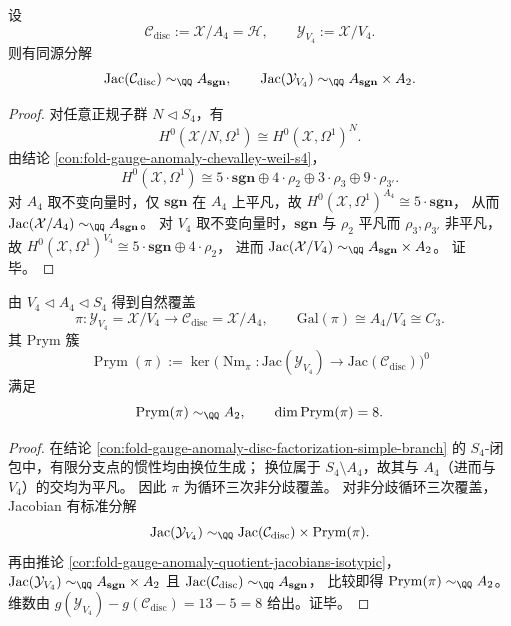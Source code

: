 \begin{corollary}\label{cor:fold-gauge-anomaly-quotient-jacobians-isotypic}
设
\[
\mathcal C_{\mathrm{disc}}:=\mathcal X/A_4=\mathcal H,
\qquad
\mathcal Y_{V_4}:=\mathcal X/V_4.
\]
则有同源分解
\[
\mathrm{Jac}(\mathcal C_{\mathrm{disc}})\sim_{\QQ}A_{\mathbf{sgn}},
\qquad
\mathrm{Jac}(\mathcal Y_{V_4})\sim_{\QQ}A_{\mathbf{sgn}}\times A_2.
\]
\end{corollary}
\begin{proof}
对任意正规子群 \(N\triangleleft S_4\)，有
\[
H^0(\mathcal X/N,\Omega^1)\cong H^0(\mathcal X,\Omega^1)^N.
\]
由结论 \ref{con:fold-gauge-anomaly-chevalley-weil-s4}，
\[
H^0(\mathcal X,\Omega^1)\cong
5\cdot \mathbf{sgn}\oplus 4\cdot \rho_2\oplus 3\cdot \rho_3\oplus 9\cdot \rho_{3'}.
\]
对 \(A_4\) 取不变向量时，仅 \(\mathbf{sgn}\) 在 \(A_4\) 上平凡，故
\(
H^0(\mathcal X,\Omega^1)^{A_4}\cong 5\cdot\mathbf{sgn}
\)，
从而 \(\mathrm{Jac}(\mathcal X/A_4)\sim_{\QQ}A_{\mathbf{sgn}}\)。
对 \(V_4\) 取不变向量时，\(\mathbf{sgn}\) 与 \(\rho_2\) 平凡而 \(\rho_3,\rho_{3'}\) 非平凡，故
\(
H^0(\mathcal X,\Omega^1)^{V_4}\cong 5\cdot\mathbf{sgn}\oplus 4\cdot\rho_2
\)，
进而
\(
\mathrm{Jac}(\mathcal X/V_4)\sim_{\QQ}A_{\mathbf{sgn}}\times A_2
\)。
证毕。
\end{proof}

\begin{theorem}\label{thm:fold-gauge-anomaly-a2-prym-realization}
由 \(V_4\triangleleft A_4\triangleleft S_4\) 得到自然覆盖
\[
\pi:\mathcal Y_{V_4}=\mathcal X/V_4\longrightarrow \mathcal C_{\mathrm{disc}}=\mathcal X/A_4,
\qquad
\mathrm{Gal}(\pi)\cong A_4/V_4\cong C_3.
\]
其 Prym 簇
\[
\operatorname{Prym}(\pi):=\ker\!\bigl(\operatorname{Nm}_{\pi}:\mathrm{Jac}(\mathcal Y_{V_4})\to \mathrm{Jac}(\mathcal C_{\mathrm{disc}})\bigr)^0
\]
满足
\[
\operatorname{Prym}(\pi)\sim_{\QQ}A_2,
\qquad
\dim \operatorname{Prym}(\pi)=8.
\]
\end{theorem}
\begin{proof}
在结论 \ref{con:fold-gauge-anomaly-disc-factorization-simple-branch} 的 \(S_4\)-闭包中，有限分支点的惯性均由换位生成；
换位属于 \(S_4\setminus A_4\)，故其与 \(A_4\)（进而与 \(V_4\)）的交均为平凡。
因此 \(\pi\) 为循环三次非分歧覆盖。
对非分歧循环三次覆盖，Jacobian 有标准分解
\[
\mathrm{Jac}(\mathcal Y_{V_4})\sim_{\QQ}\mathrm{Jac}(\mathcal C_{\mathrm{disc}})\times \operatorname{Prym}(\pi).
\]
再由推论 \ref{cor:fold-gauge-anomaly-quotient-jacobians-isotypic}，
\(
\mathrm{Jac}(\mathcal Y_{V_4})\sim_{\QQ}A_{\mathbf{sgn}}\times A_2
\)
且
\(
\mathrm{Jac}(\mathcal C_{\mathrm{disc}})\sim_{\QQ}A_{\mathbf{sgn}}
\)，
比较即得 \(\operatorname{Prym}(\pi)\sim_{\QQ}A_2\)。
维数由
\(
g(\mathcal Y_{V_4})-g(\mathcal C_{\mathrm{disc}})=13-5=8
\)
给出。证毕。
\end{proof}

